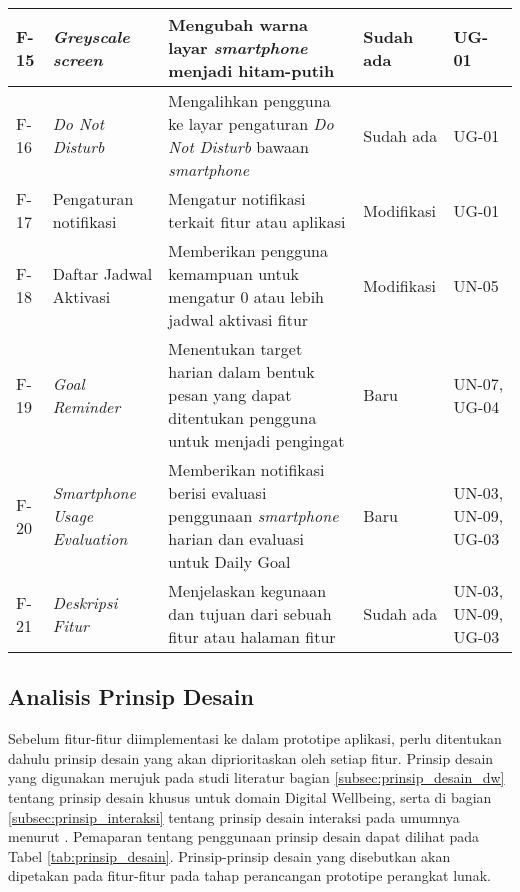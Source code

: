 \begin{small}
\begin{longtable}[c]{|W{c}{0.06\textwidth}|>{\ccnormspacingcenter}m{0.15\textwidth}|>{\ccnormspacing}m{0.35\textwidth}|>{\ccnormspacingcenter}m{0.12\textwidth}|>{\ccnormspacingcenter}m{0.16\textwidth}|}
  F-15 & \textit{Greyscale screen} & Mengubah warna layar \textit{smartphone} menjadi hitam-putih & Sudah ada & UG-01 \\ \hline
  F-16 & \textit{Do Not Disturb} & Mengalihkan pengguna ke layar pengaturan \textit{Do Not Disturb} bawaan \textit{smartphone} & Sudah ada & UG-01 \\ \hline
  F-17 & Pengaturan notifikasi & Mengatur notifikasi terkait fitur atau aplikasi & Modifikasi & UG-01 \\ \hline
  F-18 & Daftar Jadwal Aktivasi & Memberikan pengguna kemampuan untuk mengatur 0 atau lebih jadwal aktivasi fitur & Modifikasi & UN-05 \\ \hline
  F-19 & \textit{Goal Reminder} & Menentukan target harian dalam bentuk pesan yang dapat ditentukan pengguna untuk menjadi pengingat & Baru & UN-07, UG-04 \\ \hline
  F-20 & \textit{Smartphone Usage Evaluation} & Memberikan notifikasi berisi evaluasi penggunaan \textit{smartphone} harian dan evaluasi untuk Daily Goal & Baru & UN-03, UN-09, UG-03 \\ \hline
  F-21 & \textit{Deskripsi Fitur} & Menjelaskan kegunaan dan tujuan dari sebuah fitur atau halaman fitur & Sudah ada & UN-03, UN-09, UG-03 \\ \hline

\end{longtable}
\end{small}
\justifying
\FloatBarrier

\subsection{Analisis Prinsip Desain}
Sebelum fitur-fitur diimplementasi ke dalam prototipe aplikasi, perlu ditentukan dahulu prinsip desain yang akan diprioritaskan oleh setiap fitur. Prinsip desain yang digunakan merujuk pada studi literatur bagian \ref{subsec:prinsip_desain_dw} tentang prinsip desain khusus untuk domain Digital Wellbeing, serta di bagian \ref{subsec:prinsip_interaksi} tentang prinsip desain interaksi pada umumnya menurut \textcite{PreeceRogersSharp15}. Pemaparan tentang penggunaan prinsip desain dapat dilihat pada Tabel \ref{tab:prinsip_desain}. Prinsip-prinsip desain yang disebutkan akan dipetakan pada fitur-fitur pada tahap perancangan prototipe perangkat lunak.

